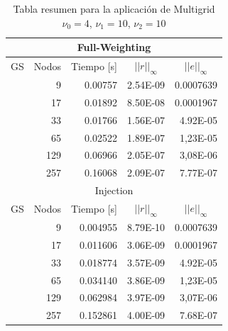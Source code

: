 \documentclass[letter,10pt]{article}
\begin{document}
\begin{table}[H]
\centering
\caption{Tabla resumen para la aplicación de Multigrid $\nu_0=4$, $\nu_1=10$, $\nu_2=10$}
\begin{tabular}[t]{|l|r|r|r|r|}
\hline
\multicolumn{5}{|c|}{Full-Weighting}\\ \hline
\multicolumn{ 1}{|c|}{GS} & \multicolumn{1}{l|}{Nodos} & \multicolumn{1}{l|}{Tiempo [s]} & \multicolumn{1}{c|}{$||r||_{\infty}$} & \multicolumn{1}{c|}{$||e||_{\infty}$} \\ \cline{ 2- 5}
\multicolumn{ 1}{|l|}{} &9 & 0.00757 & 2.54E-09 & 0.0007639 \\ \cline{ 2- 5}
\multicolumn{ 1}{|l|}{} & 17 & 0.01892 & 8.50E-08 & 0.0001967 \\ \cline{ 2- 5}
\multicolumn{ 1}{|l|}{} & 33 & 0.01766 & 1.56E-07 & 4.92E-05 \\ \cline{ 2- 5}
\multicolumn{ 1}{|l|}{} & 65 & 0.02522 & 1.89E-07 & 1,23E-05 \\ \cline{ 2- 5}
\multicolumn{ 1}{|l|}{} & 129 & 0.06966 & 2.05E-07 & 3,08E-06 \\ \cline{ 2- 5}
\multicolumn{ 1}{|l|}{} & 257 & 0.16068 & 2.09E-07 & 7.77E-07 \\ \hline
\multicolumn{5}{|c|}{Injection}\\ \hline
\multicolumn{ 1}{|c|}{GS} & \multicolumn{1}{l|}{Nodos} &\multicolumn{1}{l|}{Tiempo [s]}&  \multicolumn{1}{c|}{$||r||_{\infty}$} & \multicolumn{1}{c|}{$||e||_{\infty}$} \\ \cline{ 2- 5}
\multicolumn{1}{|l|}{} &9 & 0.004955 & 8.79E-10 & 0.0007639 \\ \cline{ 2- 5}
\multicolumn{1}{|l|}{} & 17 & 0.011606 & 3.06E-09 & 0.0001967 \\ \cline{ 2- 5}
\multicolumn{1}{|l|}{} & 33 & 0.018774 & 3.57E-09 & 4.92E-05 \\ \cline{ 2- 5}
\multicolumn{ 1}{|l|}{} & 65 & 0.034140 & 3.86E-09 & 1,23E-05 \\ \cline{ 2- 5}
\multicolumn{1}{|l|}{} & 129 & 0.062984 & 3.97E-09 & 3,07E-06 \\ \cline{ 2- 5}
\multicolumn{1}{|l|}{} & 257 & 0.152861 & 4.00E-09 & 7.68E-07 \\ \hline
\end{tabular}
\label{resumenmg10104}
\end{table}
\end{document}
